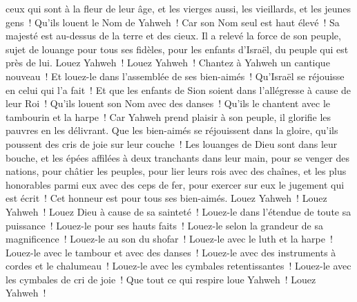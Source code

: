 \begin{multicols}{2}
ceux qui sont à la fleur de leur âge, et les vierges aussi, les vieillards, et les jeunes gens~!
Qu'ils louent le Nom de Yahweh~! Car son Nom seul est haut élevé~! Sa majesté est au-dessus de la terre et des cieux.
Il a relevé la force de son peuple, sujet de louange pour tous ses fidèles, pour les enfants d'Israël, du peuple qui est près de lui. Louez Yahweh~!
\VerseOne{}Louez Yahweh~! Chantez à Yahweh un cantique nouveau~! Et louez-le dans l'assemblée de ses bien-aimés~!
Qu'Israël se réjouisse en celui qui l'a fait~! Et que les enfants de Sion soient dans l'allégresse à cause de leur Roi~!
Qu'ils louent son Nom avec des danses~! Qu'ils le chantent avec le tambourin et la harpe~!
Car Yahweh prend plaisir à son peuple, il glorifie les pauvres en les délivrant.
Que les bien-aimés se réjouissent dans la gloire, qu'ils poussent des cris de joie sur leur couche~!
Les louanges de Dieu sont dans leur bouche, et les épées affilées à deux tranchants dans leur main,
pour se venger des nations, pour châtier les peuples,
pour lier leurs rois avec des chaînes, et les plus honorables parmi eux avec des ceps de fer,
pour exercer sur eux le jugement qui est écrit~! Cet honneur est pour tous ses bien-aimés. Louez Yahweh~!
\VerseOne{}Louez Yahweh~! Louez Dieu à cause de sa sainteté~! Louez-le dans l'étendue de toute sa puissance~!
Louez-le pour ses hauts faits~! Louez-le selon la grandeur de sa magnificence~!
Louez-le au son du shofar~! Louez-le avec le luth et la harpe~!
Louez-le avec le tambour et avec des danses~! Louez-le avec des instruments à cordes et le chalumeau~!
Louez-le avec les cymbales retentissantes~! Louez-le avec les cymbales de cri de joie~!
Que tout ce qui respire loue Yahweh~! Louez Yahweh~!
\PPE{}
\end{multicols}
